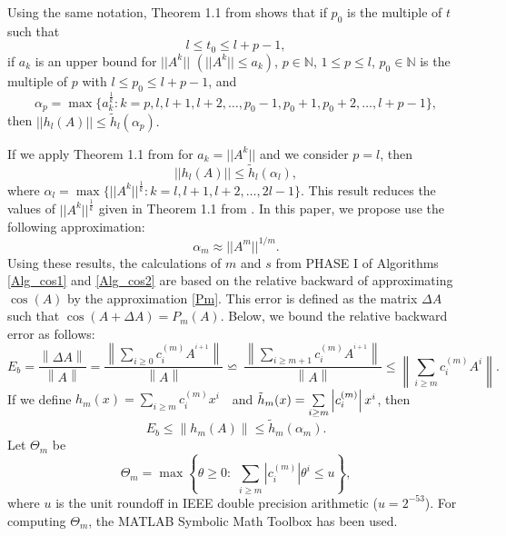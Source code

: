 Using the same notation, Theorem 1.1 from \cite{sastre2013exp} shows that if $p_0$ is the multiple of $t$ such that $$l \leqslant {t_0} \leqslant l + p - 1,$$
if $a_{k}$ is an upper bound for $||A^{k}||$ $(||A^{k}||\leq
a_{k})$, $p \in \mathbb{N}$, $1\leq p \leq l$, $p_0\in \mathbb{N}$
is the multiple of $p$ with $l\leq p_0\leq l+p-1$, and
\begin{equation}\label{alphap}
\alpha_{p}=\max\{a_{k}^{\frac{1}{k}}:k=p,l,l+1,l+2,\ldots,p_0-1,p_0+1,p_0+2,\ldots,l+p-1\},
\end{equation}then
$||h_{l}(A)||\leq \tilde{h}_{l}(\alpha_{p}).$

If we apply Theorem 1.1 from \cite{sastre2013exp} for $a_k=||A^{k}||$ and we consider $p=l$, then
$$||h_{l}(A)||\leq \tilde{h}_{l}(\alpha_{l}),$$
where $\alpha_{l}=\max\{||A^{k}||^{\frac{1}{k}}:k=l,l+1,l+2,\ldots,2l-1\}$. This result reduces the values of $||A^{k}||^{\frac{1}{k}}$  given in Theorem 1.1 from \cite{High09}.
In this paper, we propose use the following approximation:
\begin{equation}
\label{Estimation}
\alpha _m \approx ||A^{m}||^{1/m}.
\end{equation}
Using these results, the calculations of $m$ and $s$ from PHASE I of Algorithms \ref{Alg_cos1} and \ref{Alg_cos2} are based on the   relative backward  of
approximating $\cos(A)$ by the approximation \eqref{Pm}.  This error is defined as the matrix $\Delta A$ such that $\cos(A+\Delta A)=P_{m}(A)$. Below, we bound the relative backward error as follows:    
\begin{displaymath}\label{Eb}
E_b=\frac{{\left\| {\Delta A} \right\|}}{{\left\| A \right\|}} =
\frac{{\left\| {\sum\limits_{i \ge0} {{c^{(m)}_i}{A^{^{i+1}}}} }
\right\|}}{{\left\| A \right\|}} \backsimeq\ \frac{{\left\| {\sum\limits_{i \ge m+1} {{c^{(m)}_i}{A^{^{i+1}}}} }
\right\|}}{{\left\| A \right\|}} \le  \left\| {\sum\limits_{i \ge m}
{{c^{(m)}_i}{A^{i}}} } \right\|.
\end{displaymath}
If we define ${h_{m}}(x) = \sum\limits_{i \geqslant m} {{c^{(m)}_i}{x^{i}}} {\text{ }}$ and ${\tilde h_{m}}(x) = \sum\limits_{i \ge
m} {\left| {{c^{(m)}_i}} \right|{x^{i}}} {\rm{ }}$, then
\begin{equation}
E_b \le \left\| {{h_{m}}(A)} \right\| \le {{\tilde h}_{m}}({{\alpha}
_{m}}).
\end{equation}Let $\Theta_{m}$ be
\begin{equation} {\Theta_{m}} = \max \left\{
{{\theta\geq0}:\,\,\sum\limits_{i \ge m} {\left| {{c^{(m)}_i}}
\right|{\theta}^{i}}  \le u} \right\},
\end{equation}
where $u$ is the unit roundoff in IEEE double precision arithmetic ($u=2^{-53}$). For computing $ {\Theta}_{m}$, the MATLAB
Symbolic Math Toolbox has been used.  

